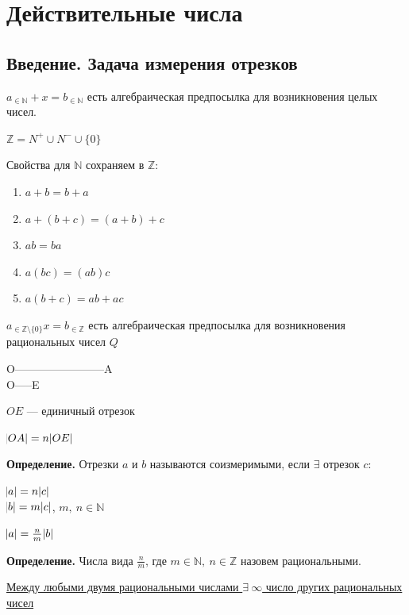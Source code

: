 \documentclass{article}
\begin{document}
    \section{Действительные числа}
        \subsection{Введение. Задача измерения отрезков}
            $a_{\in \mathbb{N}} + x = b_{\in \mathbb{N}}$ есть алгебраическая предпосылка для возникновения целых чисел.
            
            $\mathbb{Z} = N^{+} \cup N^{-} \cup \{0\}$
            
            Свойства для $\mathbb{N}$ сохраняем в $\mathbb{Z}$:

            \begin{enumerate}
                \item $a + b = b + a$
                \item $a + (b + c) = (a + b) + c$
                \item $ab = ba$
                \item $a(bc) = (ab)c$
                \item $a(b + c) = ab + ac$
            \end{enumerate}
            
            $a_{\in \mathbb{Z} \textrm{\textbackslash} \{0\}}x = b_{\in \mathbb{Z}}$ есть алгебраическая предпосылка для возникновения рациональных чисел $Q$
            
            O------------------------A\\
            O-----E
            
            $OE$ --- единичный отрезок

            $\abs{OA} = n \abs{OE}$
            
            \textbf{Определение.} Отрезки $a$ и $b$ называются соизмеримыми, если $\exists$ отрезок $c$:
            
            $\abs{a}=n\abs{c}$\\
            $\abs{b}=m\abs{c}$, $m,\ n \in \mathbb{N}$

            $\abs{a} = \frac{n}{m}\abs{b}$
            
            \textbf{Определение.} Числа вида $\frac{n}{m}$, где $m \in \mathbb{N},\ n \in \mathbb{Z}$ назовем рациональными.

            \underline{Между любыми двумя рациональными числами $\exists\ \infty$ число других рациональных чисел}
\end{document}
